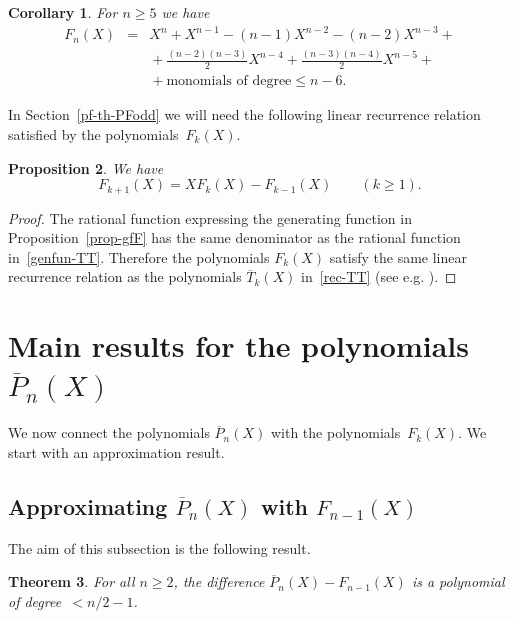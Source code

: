 \documentclass[11pt, a4paper]{amsart}
\newtheorem{theorem}{Theorem}[section]
\newtheorem{prop}[theorem]{Proposition}
\newtheorem{coro}[theorem]{Corollary}
\theoremstyle{definition}
\newcommand\Pg{\overline{P}}
\newcommand\TT{\overline{T}}
\numberwithin{equation}{section}
\begin{document}
\begin{coro}\label{coro-Fn}
For $n \geq 5$ we have 
\begin{eqnarray*}
F_n(X) & = & X^n + X^{n-1} - (n-1) X^{n-2} - (n-2) X^{n-3} + \\
&& {} + \frac{(n-2)(n-3)}{2} X^{n-4} + \frac{(n-3)(n-4)}{2} X^{n-5} + \\
&& {} + \text{monomials of degree} \leq n-6 .
\end{eqnarray*}
\end{coro}

In Section~\ref{pf-th-PFodd} we will need the following linear recurrence relation satisfied by the polynomials~$F_k(X)$.

\begin{prop}\label{prop-recF} We have 
\begin{equation*}
F_{k+1}(X) = X F_k(X) - F_{k-1}(X) \qquad (k\geq 1) .
\end{equation*}
\end{prop}

\begin{proof}
The rational function expressing the generating function in Proposition~\ref{prop-gfF} has the same denominator
as the rational function in~\eqref{genfun-TT}.
Therefore the polynomials $F_k(X)$ satisfy the same linear recurrence relation 
as the polynomials $\TT_k(X)$ in~\eqref{rec-TT} (see e.g. \cite[Chap.~6, Prop.~1.2 and Cor.~1.3]{BR}).
\end{proof}



\section{Main results for the polynomials $\Pg_n(X)$}\label{sec-resultsP}

We now connect  the polynomials $\Pg_n(X)$ with the polynomials~$F_k(X)$.
We start with an approximation result.

\subsection{Approximating $\Pg_n(X)$ with $F_{n-1}(X)$}\label{ssec-approx}

The aim of this subsection is the following result.

\begin{theorem}\label{th-approx}
For all $n\geq 2$, the difference $\Pg_n(X) - F_{n-1}(X)$ is a polynomial of degree~$< n/2 - 1$.
\end{theorem}
\end{document}
